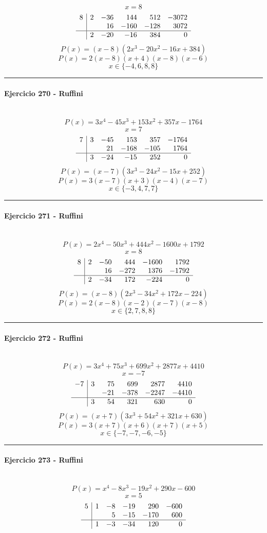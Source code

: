 \documentclass[10pt,a4paper]{article}
\newcommand{\res}[1]{\paragraph{#1}\mbox{}\\[-1.2em]}
\begin{document}
\[ x=8 \]
\[\begin{array}{r|rrrrr}8 & 2 & -36 & 144 & 512 & -3072\\  &  & 16 & -160 & -128 & 3072\\\hline  & 2 & -20 & -16 & 384 & 0\end{array}\]
\[ P(x)=(x-8)(2 x^{3} - 20 x^{2} - 16 x + 384) \]
\[ P(x)=2(x-8)(x+4)(x-8)(x-6) \]
\[ \boxed{x\in\{-4,6,8,8\}} \]
\vspace{1mm}\hrule\vspace{2mm}
\res{Ejercicio 270 - Ruffini}
\[ P(x)=3 x^{4} - 45 x^{3} + 153 x^{2} + 357 x - 1764 \]
\[ x=7 \]
\[\begin{array}{r|rrrrr}7 & 3 & -45 & 153 & 357 & -1764\\  &  & 21 & -168 & -105 & 1764\\\hline  & 3 & -24 & -15 & 252 & 0\end{array}\]
\[ P(x)=(x-7)(3 x^{3} - 24 x^{2} - 15 x + 252) \]
\[ P(x)=3(x-7)(x+3)(x-4)(x-7) \]
\[ \boxed{x\in\{-3,4,7,7\}} \]
\vspace{1mm}\hrule\vspace{2mm}
\res{Ejercicio 271 - Ruffini}
\[ P(x)=2 x^{4} - 50 x^{3} + 444 x^{2} - 1600 x + 1792 \]
\[ x=8 \]
\[\begin{array}{r|rrrrr}8 & 2 & -50 & 444 & -1600 & 1792\\  &  & 16 & -272 & 1376 & -1792\\\hline  & 2 & -34 & 172 & -224 & 0\end{array}\]
\[ P(x)=(x-8)(2 x^{3} - 34 x^{2} + 172 x - 224) \]
\[ P(x)=2(x-8)(x-2)(x-7)(x-8) \]
\[ \boxed{x\in\{2,7,8,8\}} \]
\vspace{1mm}\hrule\vspace{2mm}
\res{Ejercicio 272 - Ruffini}
\[ P(x)=3 x^{4} + 75 x^{3} + 699 x^{2} + 2877 x + 4410 \]
\[ x=-7 \]
\[\begin{array}{r|rrrrr}-7 & 3 & 75 & 699 & 2877 & 4410\\  &  & -21 & -378 & -2247 & -4410\\\hline  & 3 & 54 & 321 & 630 & 0\end{array}\]
\[ P(x)=(x+7)(3 x^{3} + 54 x^{2} + 321 x + 630) \]
\[ P(x)=3(x+7)(x+6)(x+7)(x+5) \]
\[ \boxed{x\in\{-7,-7,-6,-5\}} \]
\vspace{1mm}\hrule\vspace{2mm}
\res{Ejercicio 273 - Ruffini}
\[ P(x)=x^{4} - 8 x^{3} - 19 x^{2} + 290 x - 600 \]
\[ x=5 \]
\[\begin{array}{r|rrrrr}5 & 1 & -8 & -19 & 290 & -600\\  &  & 5 & -15 & -170 & 600\\\hline  & 1 & -3 & -34 & 120 & 0\end{array}\]
\end{document}
